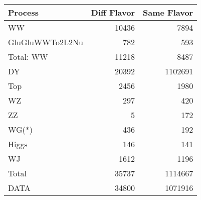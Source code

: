 \begin{table}[ht]
	\centering
\begin{tabular}{lrr}

         Process &  Diff Flavor &  Same Flavor \\
		\hline
              WW &        10436 &         7894 \\
 GluGluWWTo2L2Nu &          782 &          593 \\
\hline
       Total: WW &        11218 &         8487 \\
              DY &        20392 &      1102691 \\
             Top &         2456 &         1980 \\
              WZ &          297 &          420 \\
              ZZ &            5 &          172 \\
           WG(*) &          436 &          192 \\
           Higgs &          146 &          141 \\
              WJ &         1612 &         1196 \\
\hline
           Total &        35737 &      1114667 \\
            DATA &        34800 &      1071916 \\


\end{tabular}

\end{table}